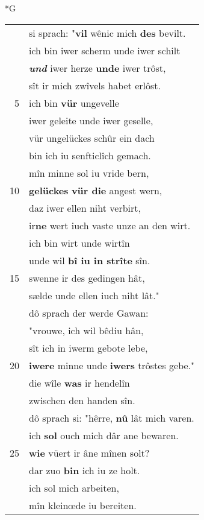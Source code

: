 \documentclass[8pt,a4paper,notitlepage]{article}
\begin{document}
\begin{table}[ht]
\begin{minipage}[t]{0.5\linewidth}
\small
\begin{center}*G
\end{center}
\begin{tabular}{rl}
 & si sprach: "\textbf{vil} wênic mich \textbf{des} bevilt.\\ 
 & ich bin iwer scherm unde iwer schilt\\ 
 & \textit{\textbf{und}} iwer herze \textbf{unde} iwer trôst,\\ 
 & sît ir mich zwîvels habet erlôst.\\ 
5 & ich bin \textbf{vür} ungevelle\\ 
 & iwer geleite unde iwer geselle,\\ 
 & vür ungelückes schûr ein dach\\ 
 & bin ich iu senfticlîch gemach.\\ 
 & mîn minne sol iu vride bern,\\ 
10 & \textbf{gelückes} \textbf{vür die} angest wern,\\ 
 & daz iwer ellen niht verbirt,\\ 
 & ir\textbf{ne} wert iuch vaste unze an den wirt.\\ 
 & ich bin wirt unde wirtîn\\ 
 & unde wil \textbf{bî iu in strîte} sîn.\\ 
15 & swenne ir des gedingen hât,\\ 
 & sælde unde ellen iuch niht lât."\\ 
 & dô sprach der werde Gawan:\\ 
 & "vrouwe, ich wil bêdiu hân,\\ 
 & sît ich in iwerm gebote lebe,\\ 
20 & \textbf{iwere} minne unde \textbf{iwers} trôstes gebe."\\ 
 & die wîle \textbf{was} ir hendelîn\\ 
 & zwischen den handen sîn.\\ 
 & dô sprach si: "hêrre, \textbf{nû} lât mich varen.\\ 
 & ich \textbf{sol} ouch mich dâr ane bewaren.\\ 
25 & \textbf{wie} vüert ir âne mînen solt?\\ 
 & dar zuo \textbf{bin} ich iu ze holt.\\ 
 & ich sol mich arbeiten,\\ 
 & mîn kleinœde iu bereiten.\\ 

\end{tabular}
\end{minipage}
\end{table}
\end{document}

